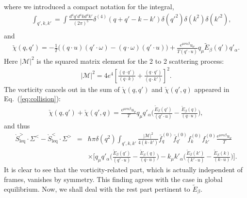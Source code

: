 \documentclass[aps,prd,showkeys,preprint,amsmath,amssymb,nofootinbib]{revtex4-1}
\begin{document}
where we introduced a compact notation for the integral,
\begin{eqnarray}\nonumber
&&\int_{q',k,k'}=\int \frac{d^4{q'}d^4{k}d^4{k'}}{(2\pi)^{5 }}\delta^{(4)}(q+q'-k-k')\delta(q'^2)\delta(k^2)\delta(k'^2),
\\
&&
\end{eqnarray}
and
\begin{eqnarray}
	\check{\chi}(q,q')=-\frac{1}{T}\Big((q\cdot u)(q'\cdot\omega)-(q\cdot \omega)(q'\cdot u)\Big)+\frac{\epsilon^{\mu\nu\alpha\beta}u_{\nu}}{T(q'\cdot u)}q_{\mu}\tilde{E}_{\beta}(q')q'_{\alpha}.
\end{eqnarray}
Here $|\mathcal{M}|^2$ is the squared matrix element for the 2 to 2 scattering process:
\begin{eqnarray}
|\mathcal{M}|^2=4e^4\left[\frac{(q\cdot q')}{(q\cdot k)}+\frac{(q\cdot q')}{(q\cdot k')}\right]^2.
\end{eqnarray}
The vorticity cancels out in the sum of $\check{\chi}(q,q')$ and $\check{\chi}(q',q)$ appeared in Eq.~(\ref{eq:collision}):
\begin{eqnarray}
	\check{\chi}(q,q')+\check{\chi}(q',q)=\frac{\epsilon^{\mu\nu\alpha\beta}u_{\nu}}{T}q_{\mu}q'_{\alpha}\Bigg(\frac{\tilde{E}_{\beta}(q')}{(q'\cdot u)}-\frac{\tilde{E}_{\beta}(q)}{(q\cdot u)}\Bigg),
\end{eqnarray}
and thus
\begin{eqnarray}\nonumber
	\grave{S}_{\text{leq}}^{>}\cdot\Sigma^<-\grave{S}_{\text{leq}}^{<}\cdot\Sigma^>
	&=&\hbar\pi\delta(q^2)\int_{ q',k,k'}
	\frac{|\mathcal{M}|^2}{4(k\cdot k')}\bar{f}^{(0)}_q\bar{f}^{(0)}_{q'}f^{(0)}_kf^{(0)}_{k'}
	\frac{\epsilon^{\mu\nu\alpha\beta}u_{\nu}}{T}
	\\
	&&\times\Bigg[q_{\mu}q'_{\alpha}\Bigg(\frac{\tilde{E}_{\beta}(q')}{(q'\cdot u)}-\frac{\tilde{E}_{\beta}(q)}{(q\cdot u)}\Bigg)-k_{\mu}k'_{\alpha}\Bigg(\frac{\tilde{E}_{\beta}(k')}{(k'\cdot u)}-\frac{\tilde{E}_{\beta}(k)}{(k\cdot u)}\Bigg)\Bigg].
\end{eqnarray}
It is clear to see that the vorticity-related part, which is actually independent of frames,   vanishes by symmetry. This finding agrees with the case in global equilibrium. Now, we shall deal with the rest part pertinent to $\tilde{E}_{\beta}$.
\end{document}
